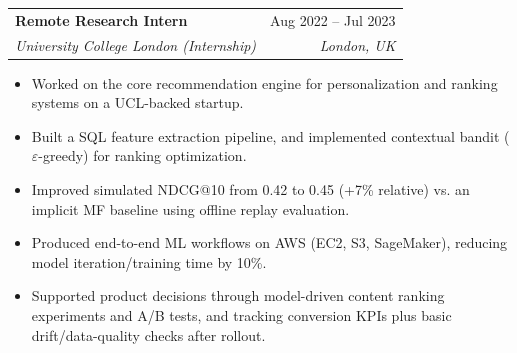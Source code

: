 \documentclass[11pt,a4paper]{article}
\makeatletter
\newcommand{\entry}[4]{%
  \noindent\begin{tabular*}{\textwidth}{@{}l@{\extracolsep{\fill}}r@{}}
    \textbf{#1} & #2 \\
    \textit{#3} & \textit{#4} \\
  \end{tabular*}\vspace{2pt}}
\makeatother
\begin{document}
\entry{Remote Research Intern}{Aug 2022 -- Jul 2023}
      {University College London (Internship)}{London, UK}
\begin{itemize}
  \item Worked on the core recommendation engine for personalization and ranking
        systems on a UCL-backed startup.
  \item Built a SQL feature extraction pipeline, and implemented contextual
        bandit ($\varepsilon$-greedy) for ranking optimization.
  \item Improved simulated NDCG@10 from 0.42 to 0.45 (+7\% relative) vs. an
        implicit MF baseline using offline replay evaluation.
  \item Produced end-to-end ML workflows on AWS (EC2, S3, SageMaker), reducing
        model iteration/training time by 10\%.
  \item Supported product decisions through model-driven content ranking
        experiments and A/B tests, and tracking conversion KPIs plus basic
        drift/data-quality checks after rollout.
\end{itemize}
\vspace{5pt}
\end{document}
